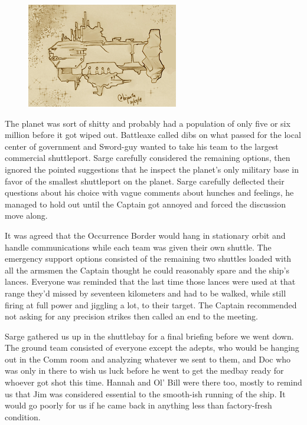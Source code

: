 \begin{figure}
	\begin{center}
		\includegraphics[width=\figwidth]{pics/11/13.png}
	\end{center}
\end{figure}
The planet was sort of shitty and probably had a population of only five or six million before it got wiped out. 
Battleaxe called dibs on what passed for the local center of government and Sword-guy wanted to take his team to the largest commercial shuttleport. 
Sarge carefully considered the remaining options, then ignored the pointed suggestions that he inspect the planet's only military base in favor of the smallest shuttleport on the planet. 
Sarge carefully deflected their questions about his choice with vague comments about hunches and feelings, he managed to hold out until the Captain got annoyed and forced the discussion move along.

It was agreed that the Occurrence Border would hang in stationary orbit and handle communications while each team was given their own shuttle. 
The emergency support options consisted of the remaining two shuttles loaded with all the armsmen the Captain thought he could reasonably spare and the ship's lances. 
Everyone was reminded that the last time those lances were used at that range they'd missed by seventeen kilometers and had to be walked, while still firing at full power and jiggling a lot, to their target. 
The Captain recommended not asking for any precision strikes then called an end to the meeting.

Sarge gathered us up in the shuttlebay for a final briefing before we went down. 
The ground team consisted of everyone except the adepts, who would be hanging out in the Comm room and analyzing whatever we sent to them, and Doc who was only in there to wish us luck before he went to get the medbay ready for whoever got shot this time. 
Hannah and Ol' Bill were there too, mostly to remind us that Jim was considered essential to the smooth-ish running of the ship. 
It would go poorly for us if he came back in anything less than factory-fresh condition.

